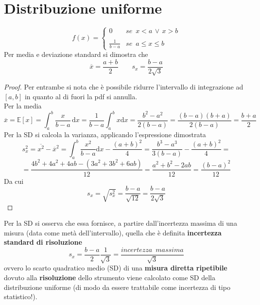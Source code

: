 \documentclass[10pt, oneside]{book}
\begin{document}
\section{Distribuzione uniforme}
\[f(x) = \begin{cases} \displaystyle 0 & se \enspace x < a \, \lor \, x > b \\ \\ \displaystyle \frac{1}{b-a} & se \enspace a \leq x \leq b
\end{cases}\]
Per media e deviazione standard si dimostra che
\[\overline{x} = \frac{a+b}{2} \qquad s_x = \frac{b-a}{2\sqrt{3}}\]
\begin{proof}
Per entrambe si nota che è possibile ridurre l'intervallo di integrazione ad $[a,b]$ in quanto al di fuori la pdf si annulla.\\
Per la media
\[\overline{x} = \mathbb{E}[x] = \int_{a}^{b} \frac{x}{b-a} \, \mathrm{d}x = \frac{1}{b-a} \int_{a}^{b}x \mathrm{d}x = \frac{b^2 - a^2}{2(b-a)} = \frac{(b-a)(b+a)}{2(b-a)} = \frac{b+a}{2}\]
Per la SD si calcola la varianza, applicando l'espressione dimostrata
\[s_x^2 = \overline{x^2} - \overline{x}^2 = \int_{a}^{b}\frac{x^2}{b-a}\mathrm{d}x - \frac{(a+b)^2}{4} = \frac{b^3 - a^3}{3(b-a)} -  \frac{(a+b)^2}{4} =\]
\[= \frac{4b^2 + 4 a^2 + 4 ab - (3 a^2 + 3 b^2 + 6 ab) }{12} = \frac{a^2 + b^2 - 2 ab}{12} = \frac{(b-a)^2}{12}\]
Da cui
\[s_x = \sqrt{s_x^2} = \frac{b-a}{\sqrt{12}} = \frac{b-a}{2\sqrt{3}}\]
\end{proof}
Per la SD si osserva che essa fornisce, a partire dall'incertezza massima di una misura (data come metà dell'intervallo), quella che è definita \textbf{incertezza standard di risoluzione}
\[s_x = \frac{b - a}{2} \frac{1}{\sqrt{3}} = \frac{incertezza \enspace massima}{\sqrt{3}}\]
ovvero lo scarto quadratico medio (SD) di una \textbf{misura diretta ripetibile} dovuto alla \textbf{risoluzione} dello strumento viene calcolato come SD della distribuzione uniforme (di modo da essere trattabile come incertezza di tipo statistico!).
\end{document}
